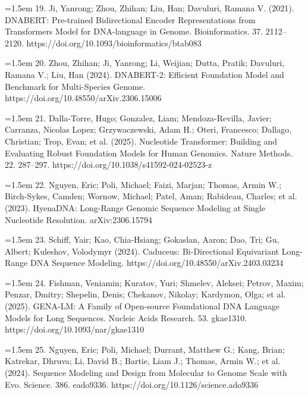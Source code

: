 \documentclass[11pt]{article}
\begin{document}
\hangindent=1.5em  19. Ji, Yanrong; Zhou, Zhihan; Liu, Han; Davuluri, Ramana V. (2021). DNABERT: Pre-trained Bidirectional Encoder Representations from Transformers Model for DNA-language in Genome. Bioinformatics. 37. 2112--2120. https://doi.org/10.1093/bioinformatics/btab083\par

\hangindent=1.5em  20. Zhou, Zhihan; Ji, Yanrong; Li, Weijian; Dutta, Pratik; Davuluri, Ramana V.; Liu, Han (2024). DNABERT-2: Efficient Foundation Model and Benchmark for Multi-Species Genome. https://doi.org/10.48550/arXiv.2306.15006\par

\hangindent=1.5em  21. Dalla-Torre, Hugo; Gonzalez, Liam; Mendoza-Revilla, Javier; Carranza, Nicolas Lopez; Grzywaczewski, Adam H.; Oteri, Francesco; Dallago, Christian; Trop, Evan; et al. (2025). Nucleotide Transformer: Building and Evaluating Robust Foundation Models for Human Genomics. Nature Methods. 22. 287--297. https://doi.org/10.1038/s41592-024-02523-z\par

\hangindent=1.5em  22. Nguyen, Eric; Poli, Michael; Faizi, Marjan; Thomas, Armin W.; Birch-Sykes, Camden; Wornow, Michael; Patel, Aman; Rabideau, Charles; et al. (2023). HyenaDNA: Long-Range Genomic Sequence Modeling at Single Nucleotide Resolution. arXiv:2306.15794\par

\hangindent=1.5em  23. Schiff, Yair; Kao, Chia-Hsiang; Gokaslan, Aaron; Dao, Tri; Gu, Albert; Kuleshov, Volodymyr (2024). Caduceus: Bi-Directional Equivariant Long-Range DNA Sequence Modeling. https://doi.org/10.48550/arXiv.2403.03234\par

\hangindent=1.5em  24. Fishman, Veniamin; Kuratov, Yuri; Shmelev, Aleksei; Petrov, Maxim; Penzar, Dmitry; Shepelin, Denis; Chekanov, Nikolay; Kardymon, Olga; et al. (2025). GENA-LM: A Family of Open-source Foundational DNA Language Models for Long Sequences. Nucleic Acids Research. 53. gkae1310. https://doi.org/10.1093/nar/gkae1310\par

\hangindent=1.5em  25. Nguyen, Eric; Poli, Michael; Durrant, Matthew G.; Kang, Brian; Katrekar, Dhruva; Li, David B.; Bartie, Liam J.; Thomas, Armin W.; et al. (2024). Sequence Modeling and Design from Molecular to Genome Scale with Evo. Science. 386. eado9336. https://doi.org/10.1126/science.ado9336\par
\end{document}
